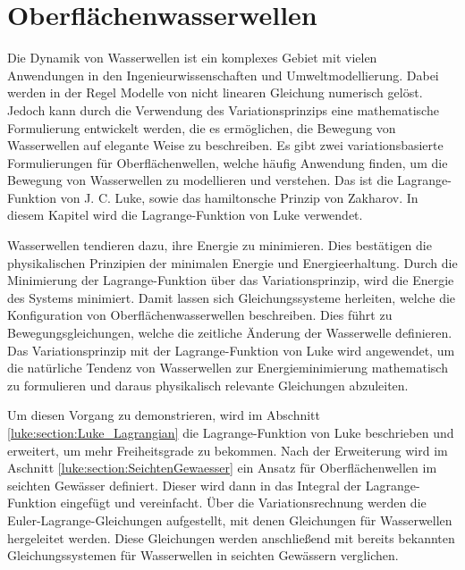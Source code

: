 %
%
%
%
\chapter{Oberflächenwasserwellen\label{chapter:luke}}
\begin{refsection}
%
%

\noindent
Die Dynamik von Wasserwellen ist ein komplexes Gebiet mit vielen Anwendungen in den Ingenieurwissenschaften und Umweltmodellierung.
%
Dabei werden in der Regel Modelle von nicht linearen Gleichung numerisch gelöst.
Jedoch kann durch die Verwendung des Variationsprinzips eine mathematische Formulierung entwickelt werden, die es ermöglichen, die Bewegung von Wasserwellen auf elegante Weise zu beschreiben.
Es gibt zwei variationsbasierte Formulierungen für Oberflächenwellen, welche häufig Anwendung finden, um die Bewegung von Wasserwellen zu modellieren und verstehen.
Das ist die Lagrange-Funktion von J. C. Luke, sowie das hamiltonsche Prinzip von Zakharov.
%
%
%
In diesem Kapitel wird die Lagrange-Funktion von Luke verwendet.

Wasserwellen tendieren dazu, ihre Energie zu minimieren.
Dies bestätigen die physikalischen Prinzipien der minimalen Energie und Energieerhaltung.
Durch die Minimierung der Lagrange-Funktion über das Variationsprinzip, wird die Energie des Systems minimiert. Damit lassen sich Gleichungssysteme herleiten, welche die Konfiguration von Oberflächenwasserwellen beschreiben.
Dies führt zu Bewegungsgleichungen, welche die zeitliche Änderung der Wasserwelle definieren.
Das Variationsprinzip mit der Lagrange-Funktion von Luke wird angewendet, um die natürliche Tendenz von Wasserwellen zur Energieminimierung mathematisch zu formulieren und daraus physikalisch relevante Gleichungen abzuleiten.

Um diesen Vorgang zu demonstrieren, wird im Abschnitt \ref{luke:section:Luke_Lagrangian} die Lagrange-Funktion von Luke beschrieben und erweitert, um mehr Freiheitsgrade zu bekommen.
Nach der Erweiterung wird im Aschnitt \ref{luke:section:SeichtenGewaesser} ein Ansatz für Oberflächenwellen im seichten Gewässer definiert.
%
Dieser wird dann in das Integral der Lagrange-Funktion eingefügt und vereinfacht.
Über die Variationsrechnung werden die Euler-Lagrange-Gleichungen aufgestellt, mit denen Gleichungen für Wasserwellen hergeleitet werden.
Diese Gleichungen werden anschließend mit bereits bekannten Gleichungssystemen für Wasserwellen in seichten Gewässern verglichen.




\printbibliography[heading=subbibliography]
\end{refsection}
